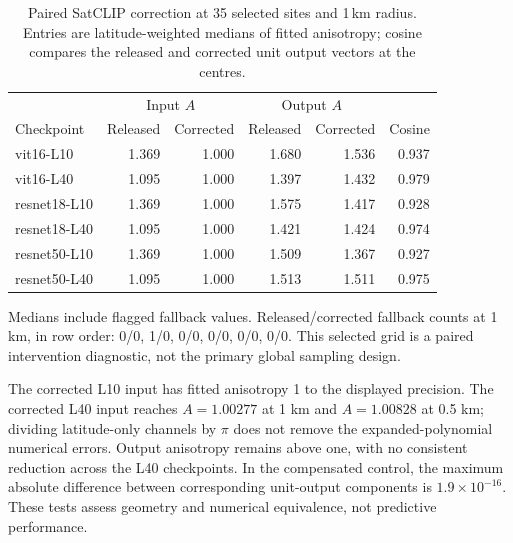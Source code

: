 \begin{table}[htbp]\centering\small
\caption{Paired SatCLIP correction at 35 selected sites and 1\,km radius. Entries are latitude-weighted medians of fitted anisotropy; cosine compares the released and corrected unit output vectors at the centres.}
\label{tab:satclipcorrection}
\begin{tabular}{@{}lrrrrr@{}}\toprule
&\multicolumn{2}{c}{Input $A$}&\multicolumn{2}{c}{Output $A$}&\\
Checkpoint&Released&Corrected&Released&Corrected&Cosine\\\midrule
vit16-L10&1.369&1.000&1.680&1.536&0.937\\
vit16-L40&1.095&1.000&1.397&1.432&0.979\\
resnet18-L10&1.369&1.000&1.575&1.417&0.928\\
resnet18-L40&1.095&1.000&1.421&1.424&0.974\\
resnet50-L10&1.369&1.000&1.509&1.367&0.927\\
resnet50-L40&1.095&1.000&1.513&1.511&0.975\\
\bottomrule\end{tabular}
\par\smallskip\parbox{.97\textwidth}{\footnotesize Medians include flagged fallback values. Released/corrected fallback counts at 1 km, in row order: 0/0, 1/0, 0/0, 0/0, 0/0, 0/0. This selected grid is a paired intervention diagnostic, not the primary global sampling design.}
\end{table}
The corrected L10 input has fitted anisotropy 1 to the displayed precision. The corrected L40 input reaches $A=1.00277$ at 1 km and $A=1.00828$ at 0.5 km; dividing latitude-only channels by $\pi$ does not remove the expanded-polynomial numerical errors. Output anisotropy remains above one, with no consistent reduction across the L40 checkpoints. In the compensated control, the maximum absolute difference between corresponding unit-output components is $1.9\times10^{-16}$. These tests assess geometry and numerical equivalence, not predictive performance.
